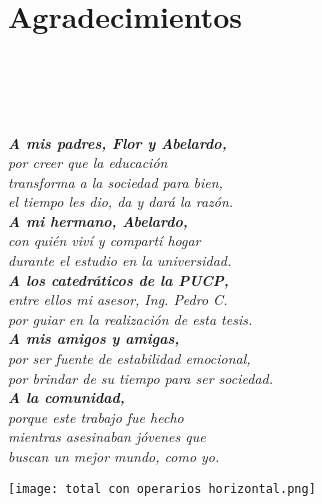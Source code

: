 
\newpage
\clearpage{\pagestyle{empty}\cleardoublepage}
\newpage

\chapter*{\centering \large Agradecimientos}

\begin{flushright}
	\; \\
	\; \\
	\; \\
	\; \\
	\textit{\textbf{A mis padres, Flor y Abelardo,}} \\
	\textit{por creer que la educación} \\
	\textit{transforma a la sociedad para bien,} \\
	\textit{el tiempo les dio, da y dará la razón.} \\
	\textit{\textbf{A mi hermano, Abelardo,}} \\
	\textit{con quién viví y compartí hogar} \\
	\textit{durante el estudio en la universidad.} \\
	\textit{\textbf{A los catedráticos de la PUCP,}} \\
	\textit{entre ellos mi asesor, Ing. Pedro C.} \\
	\textit{por guiar en la realización de esta tesis.} \\
	\textit{\textbf{A  mis amigos y amigas,}} \\
	\textit{por ser fuente de estabilidad emocional,} \\
	\textit{por brindar de su tiempo para ser sociedad.} \\
	\textit{\textbf{A  la comunidad,}} \\
	\textit{porque este trabajo fue hecho} \\
	\textit{mientras asesinaban jóvenes que} \\
	\textit{buscan un mejor mundo, como yo.} \\
	
\end{flushright}



\newpage

\begin{myfigure}[H]
	\footnotesize\centering
	\texttt{[image: total con operarios horizontal.png]}
\end{myfigure}